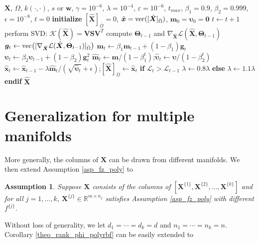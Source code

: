 \documentclass[letterpaper]{article} %
\newtheorem{assumption}{Assumption}
\begin{document}
\renewcommand{\algorithmicrequire}{\textbf{Input:}}
\renewcommand{\algorithmicensure}{\textbf{Output:}}
\begin{algorithm}[h]
\caption{Optimization for PMC using Adam+}
\label{alg.Adam+}
\begin{algorithmic}[1]
\Require
$\bm{X}$, $\Omega$, $k(\cdot,\cdot)$, $s$ or $\bm{w}$, $\gamma=10^{-6}$, $\lambda=10^{-4}$, $\varepsilon=10^{-6}$, $t_{max}$, $\beta_1=0.9$, $\beta_2=0.999$, $\epsilon=10^{-8}$, $t=0$
\State \textbf{initialize} $[\hat{\bm{X}}]_{\bar{\Omega}}=0$, $\hat{\bm{x}}=\textup{vec}([\hat{\bm{X}}]_{\bar{\Omega}})$, $\bm{m}_0=\bm{\upsilon}_0=\bm{0}$
\Repeat
\State $t\leftarrow t+1$
\State perform SVD: $\mathcal{K}(\hat{\bm{X}})=\bm{V}\bm{S}\bm{V}^T$
\State compute $\bm{\Theta}_{t-1}$ and $\nabla_{\hat{\bm{X}}}\mathcal{L}(\hat{\bm{X}},\bm{\Theta}_{t-1})$
\State $\bm{g}_t\leftarrow \textup{vec}\big([\nabla_{\hat{\bm{X}}}\mathcal{L}(\hat{\bm{X}},\bm{\Theta}_{t-1})]_{\bar{\Omega}}\big)$
\State $\bm{m}_t\leftarrow \beta_1\bm{m}_{t-1}+(1-\beta_1)\bm{g}_t$
\State $\bm{\upsilon}_t\leftarrow \beta_2\bm{\upsilon}_{t-1}+(1-\beta_2)\bm{g}_t^2$
\State $\hat{\bm{m}}_t\leftarrow \bm{m}/(1-\beta_1^t)$;\quad $\hat{\bm{\upsilon}}_t\leftarrow \bm{\upsilon}/(1-\beta_2^t)$
\State $\hat{\bm{x}}_t\leftarrow \hat{\bm{x}}_{t-1}-\lambda\hat{\bm{m}}_t/(\sqrt{\hat{\bm{\upsilon}}_t}+\epsilon)$;\quad $[\hat{\bm{X}}]_{\bar{\Omega}}\leftarrow \hat{\bm{x}}_t$
\State \textbf{if} $\mathcal{L}_t>\mathcal{L}_{t-1}$
\State \quad $\lambda\leftarrow 0.8\lambda$ \quad \textbf{else} \quad $\lambda\leftarrow 1.1\lambda$
\State \textbf{endif}
\Ensure $\hat{\bm{X}}$
\end{algorithmic}
\end{algorithm}

\section{Generalization for multiple manifolds}\label{sec_mm}
More generally, the columns of $\bm{X}$ can be drawn from different manifolds. We then extend Assumption \ref{asp_fz_poly} to
\begin{assumption}\label{def_XUoS}
Suppose $\bm{X}$ consists of the columns of $[\bm{X}^{\lbrace 1\rbrace},\bm{X}^{\lbrace 2\rbrace},\ldots,\bm{X}^{\lbrace k\rbrace}]$ and for all $j=1,\ldots, k$, $\bm{X}^{\lbrace j\rbrace}\in\mathbb{R}^{m\times n_j}$ satisfies Assumption \ref{asp_fz_poly} with different $f^{\lbrace j\rbrace}$.
\end{assumption}
Without loss of generality, we let $d_1=\cdots=d_k=d$ and $n_1=\cdots=n_k=n$.
Corollary \ref{theo_rank_phi_polyrbf} can be easily extended to
\end{document}
